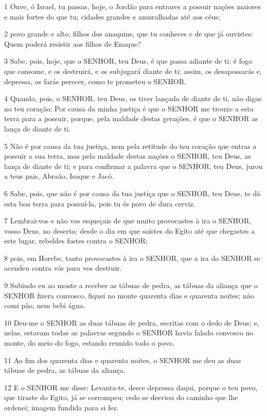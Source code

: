 \par 1 Ouve, ó Israel, tu passas, hoje, o Jordão para entrares a possuir nações maiores e mais fortes do que tu; cidades grandes e amuralhadas até aos céus;
\par 2 povo grande e alto, filhos dos anaquins, que tu conheces e de que já ouvistes: Quem poderá resistir aos filhos de Enaque?
\par 3 Sabe, pois, hoje, que o SENHOR, teu Deus, é que passa adiante de ti; é fogo que consome, e os destruirá, e os subjugará diante de ti; assim, os desapossarás e, depressa, os farás perecer, como te prometeu o SENHOR.
\par 4 Quando, pois, o SENHOR, teu Deus, os tiver lançado de diante de ti, não digas no teu coração: Por causa da minha justiça é que o SENHOR me trouxe a esta terra para a possuir, porque, pela maldade destas gerações, é que o SENHOR as lança de diante de ti.
\par 5 Não é por causa da tua justiça, nem pela retitude do teu coração que entras a possuir a sua terra, mas pela maldade destas nações o SENHOR, teu Deus, as lança de diante de ti; e para confirmar a palavra que o SENHOR, teu Deus, jurou a teus pais, Abraão, Isaque e Jacó.
\par 6 Sabe, pois, que não é por causa da tua justiça que o SENHOR, teu Deus, te dá esta boa terra para possuí-la, pois tu és povo de dura cerviz.
\par 7 Lembrai-vos e não vos esqueçais de que muito provocastes à ira o SENHOR, vosso Deus, no deserto; desde o dia em que saístes do Egito até que chegastes a este lugar, rebeldes fostes contra o SENHOR;
\par 8 pois, em Horebe, tanto provocastes à ira o SENHOR, que a ira do SENHOR se acendeu contra vós para vos destruir.
\par 9 Subindo eu ao monte a receber as tábuas de pedra, as tábuas da aliança que o SENHOR fizera convosco, fiquei no monte quarenta dias e quarenta noites; não comi pão, nem bebi água.
\par 10 Deu-me o SENHOR as duas tábuas de pedra, escritas com o dedo de Deus; e, nelas, estavam todas as palavras segundo o SENHOR havia falado convosco no monte, do meio do fogo, estando reunido todo o povo.
\par 11 Ao fim dos quarenta dias e quarenta noites, o SENHOR me deu as duas tábuas de pedra, as tábuas da aliança.
\par 12 E o SENHOR me disse: Levanta-te, desce depressa daqui, porque o teu povo, que tiraste do Egito, já se corrompeu; cedo se desviou do caminho que lhe ordenei; imagem fundida para si fez.
